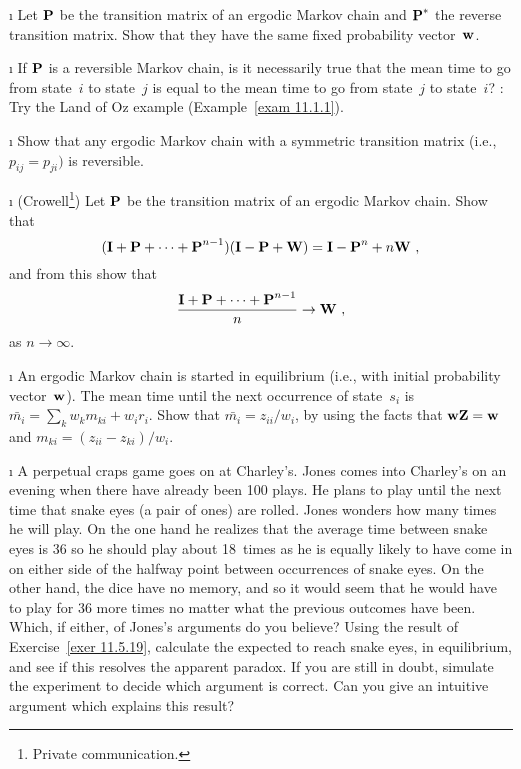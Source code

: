 \begin{LJSItem}
\i\label{exer 11.5.13} Let ${\mbox{\bf P}\/}$ be the transition matrix of an ergodic
Markov 
chain and ${\mbox{\bf P}\/}^*$ the reverse transition matrix.  Show that they have the
same 
fixed probability vector~${\mbox{\bf w}\/}$.

\i\label{exer 11.5.14} If ${\mbox{\bf P}\/}$ is a reversible Markov chain, is it 
necessarily true that the mean time to go from state~$i$ to state~$j$ is equal 
to the mean time to go from state~$j$ to state~$i$?  : Try the 
Land of Oz example (Example~\ref{exam 11.1.1}).

\i\label{exer 11.5.15} Show that any ergodic Markov chain with a symmetric 
transition matrix (i.e., $p_{ij} = p_{ji})$ is reversible.

\i\label{exer 11.5.18} (Crowell\footnote{Private
communication.}) Let ${\mbox{\bf P}\/}$ 
be the transition matrix of an ergodic Markov chain.  Show that
$$
({\mbox{\bf I}\/} + {\mbox{\bf P}\/} +\cdots+ {\mbox{\bf P}\/}^{n - 1})({\mbox{\bf I}\/} - {\mbox{\bf P}\/} + {\mbox{\bf W}\/})
= {\mbox{\bf I}\/} -
{\mbox{\bf P}\/}^n + n{\mbox{\bf W}\/}\ ,
$$
and from this show that
$$
\frac{{\mbox{\bf I}\/} + {\mbox{\bf P}\/} +\cdots+ {\mbox{\bf P}\/}^{n - 1}}n \to {\mbox{\bf W}\/}\ ,
$$ 
as $n \rightarrow \infty$.

\i\label{exer 11.5.19} An ergodic Markov chain is started in equilibrium
(i.e., with initial probability vector~${\mbox{\bf w}\/}$).  The mean time until the
next
occurrence of state~$s_i$ is $\bar{m_i} = \sum_k w_k m_{ki} + w_i r_i$. 
Show that $\bar {m_i} = z_{ii}/w_i$, by using the facts that ${\mbox{\bf w}\/}{\mbox{\bf Z}\/}
= 
{\mbox{\bf w}\/}$ and $m_{ki} = (z_{ii} - z_{ki})/w_i$.

\i\label{exer 11.5.20} A perpetual craps game goes on at
Charley's.  Jones comes 
into Charley's on an evening when there have already been 100 plays.  He plans
to
play until the next time that snake eyes (a pair of ones) are rolled.  Jones
wonders
how many times he will play.  On the one hand he realizes that the average time
between snake eyes is 36 so he should play about 18~times as he is equally
likely to have come in on either side of the halfway point between occurrences
of snake eyes.  On the other hand, the dice have no memory, and so it would
seem that he would have to play for 36 more times no matter what the previous
outcomes have been.  Which, if either, of Jones's arguments do you believe? 
Using the result of Exercise~\ref{exer 11.5.19}, calculate the expected to 
reach snake eyes, in equilibrium, and see if this resolves the apparent
paradox.  
If you are still in doubt, simulate the experiment to decide which argument is
correct.  Can you give an
intuitive argument which explains this result?


\end{LJSItem}
